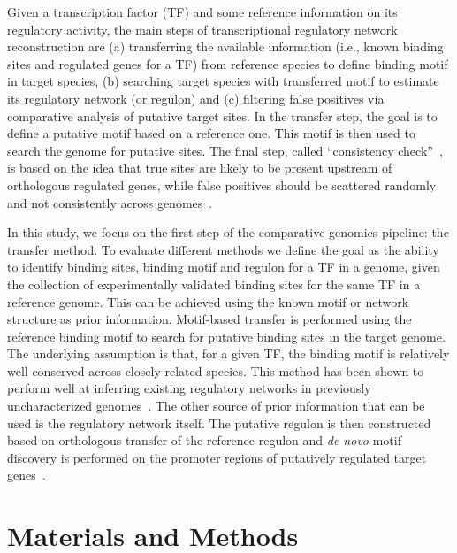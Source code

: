 \documentclass[]{llncs}
\begin{document}
Given a transcription factor (TF) and some reference information on its
regulatory activity, the main steps of transcriptional regulatory network
reconstruction are (a) transferring the available information (i.e., known
binding sites and regulated genes for a TF) from reference species to define
binding motif in target species, (b) searching target species with transferred
motif to estimate its regulatory network (or regulon) and (c) filtering false
positives via comparative analysis of putative target sites. In the transfer
step, the goal is to define a putative motif based on a reference one. This
motif is then used to search the genome for putative sites. The final step,
called “consistency check”~\cite{rodionov2007comparative}, is based on the idea
that true sites are likely to be present upstream of orthologous regulated
genes, while false positives should be scattered randomly and not consistently
across genomes~\cite{tan2001comparative, mironov1999computer,
  makarova2001conservation, rodionov2000transcriptional, panina2001comparative,
  leyn2011control, rodionov2004reconstruction, kazakov2009comparative}.

In this study, we focus on the first step of the comparative genomics pipeline:
the transfer method. To evaluate different methods we define the goal as the
ability to identify binding sites, binding motif and regulon for a TF in a
genome, given the collection of experimentally validated binding sites for the
same TF in a reference genome. This can be achieved using the known motif or
network structure as prior information. Motif-based transfer is performed using
the reference binding motif to search for putative binding sites in the target
genome. The underlying assumption is that, for a given TF, the binding motif is
relatively well conserved across closely related species. This method has been
shown to perform well at inferring existing regulatory networks in previously
uncharacterized genomes~\cite{mironov1999computer, tan2001comparative,
  rodionov2008transcriptional, erill2004differences}. The other source of prior
information that can be used is the regulatory network itself. The putative
regulon is then constructed based on orthologous transfer of the reference
regulon and \textit{de novo} motif discovery is performed on the promoter
regions of putatively regulated target genes~\cite{shelton1997phylogenetic,
  panina2003comparative, mccue2001phylogenetic, wang2003combining,
  leyn2013genomic, zhang2009genome, zhang2010simultaneous}.

\section{Materials and Methods}
\end{document}
